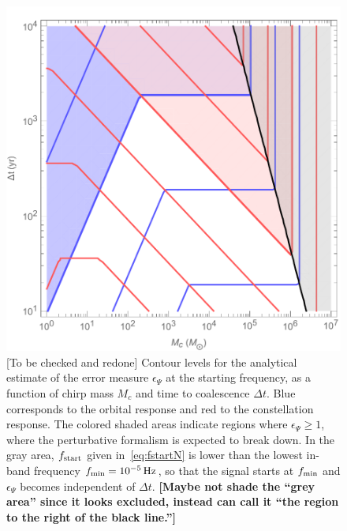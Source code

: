 \documentclass[aps,showpacs,twocolumn,
prd,superscriptaddress,nofootinbib]{revtex4-1}
\newcommand{\Hz}{\,\mathrm{Hz}}
\newcommand{\Mchirp}{M_{c}}
\newcommand{\SM}[1]{{\color{Red} #1}}
\newcommand{\jgb}[1]{{\color{DarkGreen} #1}}
\begin{document}
\begin{figure}
  \centering
  \includegraphics[width=.9\linewidth]{plots/lisafom_Psi_McDeltat.pdf}
  \caption{\SM{[To be checked and redone]} Contour levels for the analytical estimate of the error measure $\epsilon_{\Psi}$ at the starting frequency, as a function of chirp mass $\Mchirp$ and time to coalescence $\Delta t$. Blue corresponds to the orbital response and red to the constellation response. The colored shaded areas indicate regions where $\epsilon_{\Psi} \geq 1$, where the perturbative formalism is expected to break down. In the gray area, $f_{\rm start}$ given in~\eqref{eq:fstartN} is lower than the lowest in-band frequency $f_{\rm min} = 10^{-5}\Hz$, so that the signal starts at $f_{\rm min}$ and $\epsilon_{\Psi}$ becomes independent of $\Delta t$.\jgb{\bf[Maybe not shade the ``grey area'' since it looks excluded, instead can call it ``the region to the right of the black line.'']} }
  \label{fig:lisafomPsiMcDeltat}
\end{figure}
\end{document}
